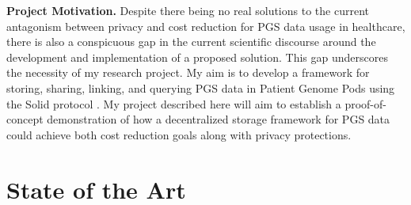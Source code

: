 \documentclass[runningheads]{llncs}
\begin{document}

\textbf{Project Motivation.}
Despite there being no real solutions to the current antagonism between privacy and cost reduction for PGS data usage in healthcare, there is also a conspicuous gap in the current scientific discourse around the development and implementation of a proposed solution. 
This gap underscores the necessity of my research project.
My aim is to develop a framework for storing, sharing, linking, and querying PGS data in Patient Genome Pods using the Solid protocol \cite{capadisli_solid_nodate}.
My project described here will aim to establish a proof-of-concept demonstration of how a decentralized storage framework for PGS data could achieve both cost reduction goals along with privacy protections.


\section{State of the Art}

\end{document}
